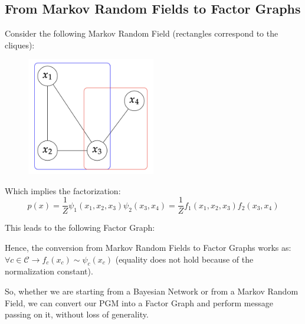 \subsection{From Markov Random Fields to Factor Graphs}
Consider the following Markov Random Field (rectangles correspond to the cliques):
\begin{figure}[H]
    \centering
    \includegraphics[width=0.5\textwidth]{assets/fig20.png}
\end{figure}

Which implies the factorization:
$$
    p(x) = \frac{1}{Z}\psi_1(x_1, x_2, x_3)\psi_2(x_3, x_4) = \frac{1}{Z}f_1(x_1, x_2, x_3)f_2(x_3, x_4)
$$

This leads to the following Factor Graph:
\begin{center}
\end{center}

Hence, the conversion from Markov Random Fields to Factor Graphs works as: $\forall c \in \mathcal{C} \rightarrow f_c(x_c) \sim \psi_c(x_c) $ (equality does not hold because of
the normalization constant).

So, whether we are starting from a Bayesian Network or from a Markov
Random Field, we can convert our PGM into a Factor Graph and perform
message passing on it, without loss of generality.

